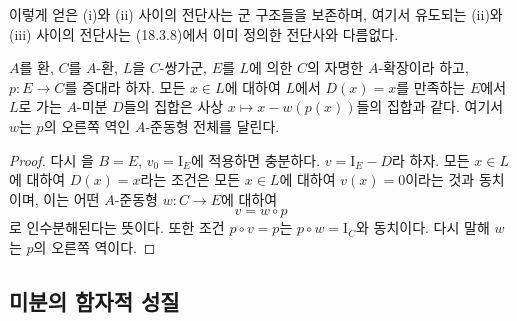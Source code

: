 이렇게 얻은 (i)와 (ii) 사이의 전단사는 군 구조들을 보존하며,
여기서 유도되는 (ii)와 (iii) 사이의 전단사는 (18.3.8)에서 이미
정의한 전단사와 다름없다.

\begin{corollary}[20.1.7]
\label{0.20.1.7-ko}
$A$를 환, $C$를 $A$-환, $L$을 $C$-쌍가군, $E$를 $L$에 의한
$C$의 자명한 $A$-확장이라 하고, $p:E\to C$를 증대라 하자.
모든 $x\in L$에 대하여 $L$에서 $D(x)=x$를 만족하는 $E$에서
$L$로 가는 $A$-미분 $D$들의 집합은 사상
$x\mapsto x-w(p(x))$들의 집합과 같다. 여기서 $w$는 $p$의 오른쪽
역인 $A$-준동형 전체를 달린다.
\end{corollary}

\begin{proof}
다시 을 $B=E$, $v_0=\mathrm I_E$에 적용하면
충분하다. $v=\mathrm I_E-D$라 하자. 모든 $x\in L$에 대하여
$D(x)=x$라는 조건은 모든 $x\in L$에 대하여 $v(x)=0$이라는 것과
동치이며, 이는 어떤 $A$-준동형 $w:C\to E$에 대하여
\[
  v=w\circ p
\]
로 인수분해된다는 뜻이다. 또한 조건 $p\circ v=p$는
$p\circ w=\mathrm I_C$와 동치이다. 다시 말해 $w$는 $p$의 오른쪽
역이다.
\end{proof}

\subsection{미분의 함자적 성질}
\label{subsection:0.20.2-ko}

